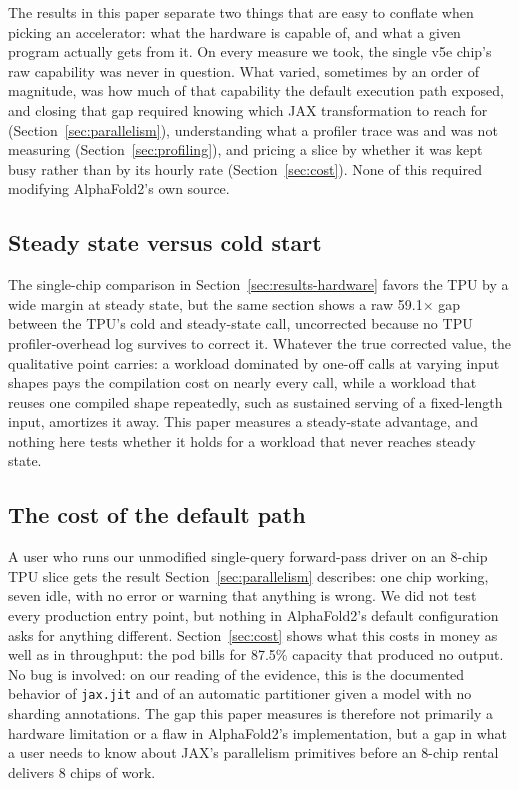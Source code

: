 
The results in this paper separate two things that are easy to
conflate when picking an accelerator: what the hardware is capable of,
and what a given program actually gets from it. On every measure we
took, the single v5e chip's raw capability was never in question. What
varied, sometimes by an order of magnitude, was how much of that
capability the default execution path exposed, and closing that gap
required knowing which JAX transformation to reach for
(Section~\ref{sec:parallelism}), understanding what a profiler trace
was and was not measuring (Section~\ref{sec:profiling}), and pricing a
slice by whether it was kept busy rather than by its hourly rate
(Section~\ref{sec:cost}). None of this required modifying AlphaFold2's
own source.

\subsection{Steady state versus cold start}
\label{sec:disc-when}

The single-chip comparison in Section~\ref{sec:results-hardware}
favors the TPU by a wide margin at steady state, but the same section
shows a raw 59.1$\times$ gap between the TPU's cold and steady-state
call, uncorrected because no TPU profiler-overhead log survives to
correct it. Whatever the true corrected value, the qualitative point
carries: a workload dominated by one-off calls at varying input shapes
pays the compilation cost on nearly every call, while a workload that
reuses one compiled shape repeatedly, such as sustained serving of a
fixed-length input, amortizes it away. This paper measures a
steady-state advantage, and nothing here tests whether it holds for a
workload that never reaches steady state.

\subsection{The cost of the default path}
\label{sec:disc-default}

A user who runs our unmodified single-query forward-pass driver on an
8-chip TPU slice gets the result Section~\ref{sec:parallelism}
describes: one chip working, seven idle, with no error or warning that
anything is wrong. We did not test every production entry point, but
nothing in AlphaFold2's default configuration asks for anything
different. Section~\ref{sec:cost}
shows what this costs in money as well as in throughput: the pod bills
for 87.5\% capacity that produced no output. No bug is involved:
on our reading of the evidence, this is the documented behavior of
\texttt{jax.jit} and of an automatic partitioner given a model with no
sharding annotations. The gap this paper
measures is therefore not primarily a hardware limitation or a flaw in
AlphaFold2's implementation, but a gap in what a user needs to know
about JAX's parallelism primitives before an 8-chip rental delivers
8 chips of work.
